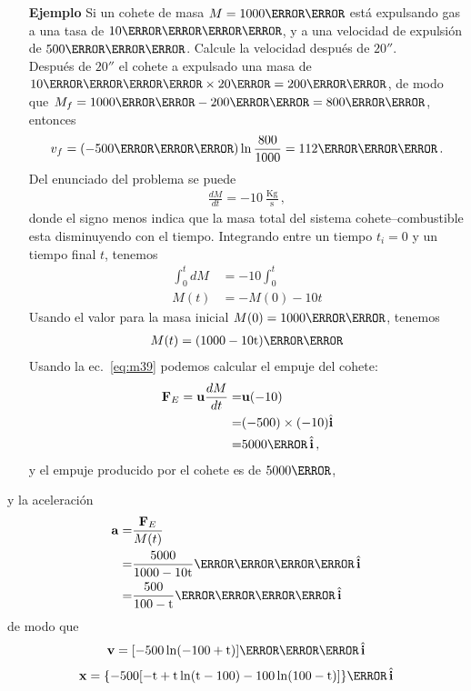 \begin{itemize}
\item[\textbf{Ejemplo}]Si un cohete de masa $M=\unit{1000}{\kilo\gram}$ está expulsando gas a una tasa de $\unit{10}{\kilo\gram\per\second}$, y a una velocidad de expulsión de $\unit{500}{\meter\per\second}$. Calcule la velocidad después de $\unit{20}{\second}$.\\
Después de $\unit{20}{\second}$ el cohete a expulsado una masa de $\unit{10}{\kilo\gram\per\second}\timesm\unit{20}{\second}=\unit{200}{\kilo\gram}$, de modo que $M_f=\unit{1000}{\kilo\gram}-\unit{200}{\kilo\gram}=\unit{800}{\kilo\gram}$, entonces
\begin{align}
  v_f=(-\unit{500}{\meter\per\second})\ln\frac{800}{1000}=\unit{112}{\meter\per\second}\,.
\end{align}
Del enunciado del problema se puede 
\begin{align}
  \frac{dM}{dt}=-10\ \frac{\text{Kg}}{\text{s}}\,,
\end{align}
donde el signo menos indica que la masa total del sistema cohete--combustible esta disminuyendo con el tiempo. Integrando entre un tiempo $t_i=0$ y un tiempo final $t$, tenemos
\begin{align}
  \int_0^t dM&=-10\int_0^t\nonumber\\
  M(t)&=-M(0)-10 t
\end{align}
Usando el valor para la masa inicial $M(0)=\unit{1000}{\kilo\gram}$, tenemos
\begin{align}
  M(t)=\unit{(1000-10t)}{\kilo\gram}
\end{align}
Usando la ec.~\eqref{eq:m39} podemos calcular el empuje del cohete:
\begin{align}
  \mathbf{F}_E=\mathbf{u}\frac{dM}{dt}=&\mathbf{u}(-10)\nonumber\\
  =&(-500)\timesm(-10)\hat{\mathbf{i}}\nonumber\\
  =&{5000}{\newton}\,\hat{\mathbf{i}}\,,
\end{align}
y  el empuje producido por el cohete es de ${5000}{\newton}$,  
\end{itemize}

y la aceleración
\begin{align}
  \mathbf{a}=&\frac{\mathbf{F}_E}{M(t)}\nonumber\\
  =&\unit{\frac{5000}{1000-10t}}{\meter\per\second\squared}\,\hat{\mathbf{i}}\nonumber\\
  =&\unit{\frac{500}{100-t}}{\meter\per\second\squared}\,\hat{\mathbf{i}}
\end{align}
de modo que
\begin{align}
  \textbf{v}=\unit{[-500\ln(-100+t)]}{\meter\per\second}\,\hat{\mathbf{i}}
\end{align}
\begin{align}
 \mathbf{x}=\unit{\{-500 [-t+t \ln (t-100)-100 \ln (100-t)]\}}{\meter}\,\hat{\mathbf{i}}
\end{align}


